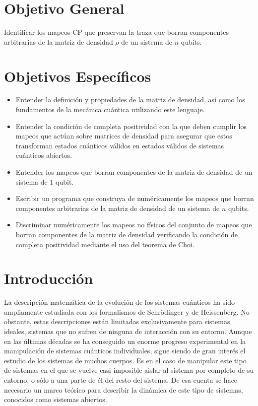 \section*{Objetivo General}
Identificar los mapeos CP  que preservan la traza que borran
componentes arbitrarias de la matriz de densidad $\rho$ de 
un sistema de $n$ qubits. 	

\section*{Objetivos Específicos}
\begin{itemize}
\item Entender la definición y propiedades de la matriz de densidad, así como
	  los fundamentos de la mecánica cuántica utilizando este lenguaje.
\item Entender la condición de completa positividad con la que deben cumplir 
	  los mapeos que actúan sobre matrices de densidad para asegurar que estos 
	  transforman estados cuánticos válidos en estados válidos de sistemas 
	  cuánticos abiertos.
\item Entender los mapeos que borran componentes de la matriz de densidad
	  de un sistema de 1 qubit.
\item Escribir un programa que construya de numéricamente los mapeos que
	  borran componentes arbitrarias de la matriz de densidad de un sistema 
	  de $n$ qubits.
\item Discriminar numéricamente los mapeos no físicos del conjunto de mapeos
	  que borran componentes de la matriz de densidad verificando 
	  la condición de completa positividad mediante el uso del teorema de Choi. 
\end{itemize}

\section*{Introducción}
La descripción matemática de la evolución de los sistemas cuánticos 
ha sido ampliamente estudiada con los formalismos 
de Schrödinger y de Heissenberg. 
No obstante, estas descripciones están limitadas
exclusivamente para sistemas ideales, sistemas 
que no sufren de ninguna de interacción con 
su entorno. Aunque en las últimas décadas se ha 
conseguido un enorme progreso experimental en la manipulación 
de sistemas cuánticos individuales, sigue siendo de gran interés el 
estudio de los sistemas de muchos cuerpos. 
Es en el caso de manipular este tipo de sistemas  en el que 
se vuelve casi imposible aislar al sistema por completo de su entorno, 
o sólo a una parte de él del resto del sistema. 
De esa cuenta se hace necesario un marco teórico 
para describir la dinámica de este tipo de sistemas, 
conocidos como sistemas abiertos.

